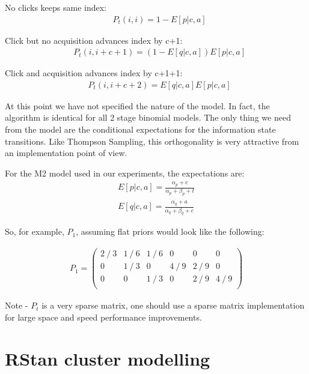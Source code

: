 \documentclass[11pt,a4,singlespacing,titlepagenumber=on]{scrreprt}
\numberwithin{equation}{chapter} %
\theoremstyle{remark}
\begin{document}
No clicks keeps same index:
\begin{align}
	&P_t(i,i) = 1 - E[p|c,a]
\end{align}

Click but no acquisition advances index by c+1:
\begin{align}
	&P_t(i,i+c+1) = (1 - E[q|c,a])E[p|c,a] 
\end{align}

Click and acquisition advances index by c+1+1:
\begin{align}
	&P_t(i,i+c+2) = E[q|c,a]E[p|c,a] 
\end{align}

At this point we have not specified the nature of the model. In fact, the algorithm is identical for all 2 stage binomial models. The only thing we need from the model are the conditional expectations for the information state transitions. Like Thompson Sampling, this orthogonality is very attractive from an implementation point of view.

For the M2 model used in our experiments, the expectations are:
\begin{align}
	E[p|c,a] = \frac{\alpha_p + c}{\alpha_p + \beta_p + t} \\
	E[q|c,a] = \frac{\alpha_q + a}{\alpha_q + \beta_q + c}
\end{align}

So, for example, $P_1$, assuming flat priors would look like the following:

\begin{align}
P_1 =
\begin{pmatrix}
  2\mathbin{/}3 & 1\mathbin{/}6 & 1\mathbin{/}6 & 0 & 0 & 0\\
  0 & 1\mathbin{/}3 & 0 & 4\mathbin{/}9 & 2\mathbin{/}9 & 0\\
  0 & 0 & 1\mathbin{/}3 & 0 & 2\mathbin{/}9 & 4\mathbin{/}9\\
\end{pmatrix}
\end{align}


Note - $P_t$ is a very sparse matrix, one should use a sparse matrix implementation for large space and speed performance improvements.

\section{RStan cluster modelling}
\end{document}
